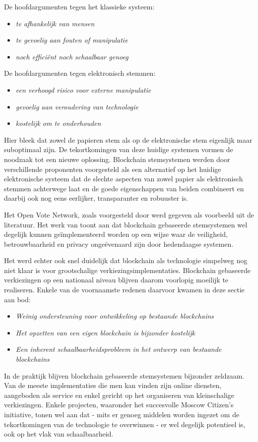 	De hoofdargumenten tegen het klassieke systeem:
	\begin{itemize}
		\item\textit{te afhankelijk van mensen}
		\item\textit{te gevoelig aan fouten of manipulatie}
		\item\textit{noch efficiënt noch schaalbaar genoeg}
	\end{itemize}
	
	De hoofdargumenten tegen elektronisch stemmen:
	
	\begin{itemize}
		\item\textit{een verhoogd risico voor externe manipulatie}
		\item\textit{gevoelig aan veroudering van technologie}
		\item\textit{kostelijk om te onderhouden}
	\end{itemize}
	
	Hier bleek dat zowel de papieren stem als op de elektronische stem eigenlijk maar suboptimaal zijn. De tekortkomingen van deze huidige systemen vormen de noodzaak tot een nieuwe oplossing. Blockchain stemsystemen werden door verschillende proponenten voorgesteld als een alternatief op het huidige elektronische systeem dat de slechte aspecten van zowel papier als elektronisch stemmen achterwege laat en de goede eigenschappen van beiden combineert en daarbij ook nog eens eerlijker, transparanter en robuuster is.
	
	Het Open Vote Network, zoals voorgesteld door \textcite{McCorry2017} werd gegeven als voorbeeld uit de literatuur. Het werk van \textcite{McCorry2017} toont aan dat blockchain gebaseerde stemsystemen wel degelijk kunnen geïmplementeerd worden op een wijze waar de veiligheid, betrouwbaarheid en privacy ongeëvenaard zijn door hedendaagse systemen.
	
	Het werd echter ook snel duidelijk dat blockchain als technologie simpelweg nog niet klaar is voor grootschalige verkiezingsimplementaties. Blockchain gebaseerde verkiezingen op een nationaal niveau blijven daarom voorlopig moeilijk te realiseren.  Enkele van de voornaamste redenen daarvoor kwamen in deze sectie aan bod:
	\begin{itemize}
		\item\textit{Weinig ondersteuning voor ontwikkeling op bestaande blockchains}
		\item\textit{Het opzetten van een eigen blockchain is bijzonder kostelijk}
		\item\textit{Een inherent schaalbaarheidsprobleem in het ontwerp van bestaande blockchains}
	\end{itemize}
	In de praktijk blijven blockchain gebaseerde stemsystemen bijzonder zeldzaam. Van de meeste  implementaties die men kan vinden zijn online diensten, aangeboden als service en enkel gericht op het organiseren van kleinschalige verkiezingen. Enkele projecten, waaronder het succesvolle Moscow Citizen's initiative, tonen wel aan dat - mits er  genoeg middelen worden ingezet om de tekortkomingen van de technologie te overwinnen - er wel degelijk potentieel is, ook op het vlak van schaalbaarheid.
	

